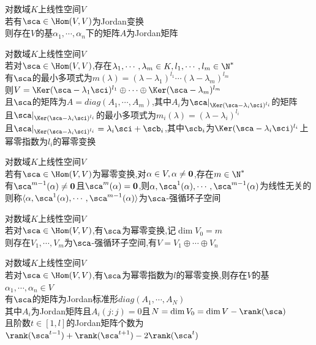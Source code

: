 \begin{dingli}
对数域$K$上线性空间$V$\\
若有$\sca\in \Hom(V,V)$为Jordan变换\\
则存在$V$的基$\alpha_1,\cdots,\alpha_n$下的矩阵$A$为Jordan矩阵
\end{dingli}

\begin{dingli}
对数域$K$上线性空间$V$\\
若对$\sca\in \Hom(V,V)$,存在$\lambda_1,\cdots,\lambda_m\in K,l_1,\cdots,l_m\in\N^*$\\
有$\sca$的最小多项式为$m(\lambda)=(\lambda-\lambda_1)^{l_1}\cdots(\lambda-\lambda_m)^{l_m}$\\
则$V=\Ker(\sca-\lambda_1\sci)^{l_1}\oplus\cdots\oplus\Ker(\sca-\lambda_m)^{l_m}$\\
且$\sca$的矩阵为$A=diag(A_1,\cdots,A_m)$,其中$A_i$为$\sca|_{\Ker(\sca-\lambda_i\sci)^{l_i}}$的矩阵\\
且$\sca|_{\Ker(\sca-\lambda_i\sci)^{l_i}}$的最小多项式为$m_i(\lambda)=(\lambda-\lambda_i)^{l_i}$\\
且$\sca|_{\Ker(\sca-\lambda_i\sci)^{l_i}}=\lambda_i\sci+\scb_i$,其中$\scb_i$为$\Ker(\sca-\lambda_i\sci)^{l_i}$上幂零指数为$l_i$的幂零变换
\end{dingli}

\begin{dingyi}
对数域$K$上线性空间$V$\\
若有$\sca\in \Hom(V,V)$为幂零变换,对$\alpha\in V,\alpha\neq {\bf0}$,存在$m\in\N^*$\\
有$\sca^{m-1}(\alpha)\neq{\bf0}$且$\sca^m(\alpha)={\bf0}$,则$\alpha,\sca^1(\alpha),\cdots,\sca^{m-1}(\alpha)$为线性无关的\\
则称$\langle\alpha,\sca^1(\alpha),\cdots,\sca^{m-1}(\alpha)\rangle$为$\sca$-强循环子空间
\end{dingyi}

\begin{dingli}
对数域$K$上线性空间$V$\\
若对$\sca\in \Hom(V,V)$,有$\sca$为幂零变换,记$\dim V_0=m$\\
则存在$V_1,\cdots,V_m$为$\sca$-强循环子空间,有$V=V_1\oplus\cdots\oplus V_n$
\end{dingli}

\begin{dingli}
对数域$K$上线性空间$V$\\
若对$\sca\in \Hom(V,V)$,有$\sca$为幂零指数为$l$的幂零变换,则存在$V$的基$\alpha_1,\cdots,\alpha_n\in V$\\
有$\sca$的矩阵为Jordan标准形$diag(A_1,\cdots,A_N)$\\
其中$A_i$为Jordan矩阵且$A_i(j:j)=0$且$N=\dim V_0=\dim V-\rank(\sca)$\\
且阶数$t\in[1,l]$的Jordan矩阵个数为$\rank(\sca^{t-1})+\rank(\sca^{t+1})-2\rank(\sca^t)$
\end{dingli}

